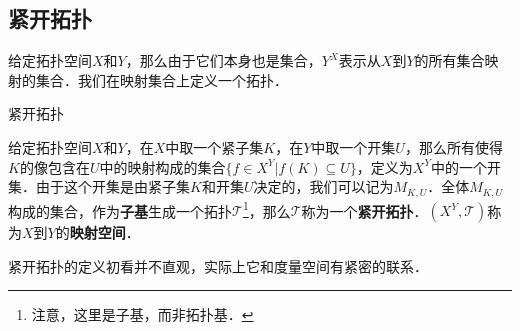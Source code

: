 \subsection{紧开拓扑}

给定拓扑空间$X$和$Y$，那么由于它们本身也是集合，$Y^X$表示从$X$到$Y$的所有集合映射的集合．我们在映射集合上定义一个拓扑．

\begin{definition}{紧开拓扑}

给定拓扑空间$X$和$Y$，在$X$中取一个紧子集$K$，在$Y$中取一个开集$U$，那么所有使得$K$的像包含在$U$中的映射构成的集合$\{f\in X^Y|f(K)\subseteq U\}$，定义为$X^Y$中的一个开集．由于这个开集是由紧子集$K$和开集$U$决定的，我们可以记为$M_{K, U}$．全体$M_{K, U}$构成的集合，作为\textbf{子基}生成一个拓扑$\mathcal{T}$\footnote{注意，这里是子基，而非拓扑基．}，那么$\mathcal{T}$称为一个\textbf{紧开拓扑}．$(X^Y, \mathcal{T})$称为$X$到$Y$的\textbf{映射空间}．

\end{definition}

紧开拓扑的定义初看并不直观，实际上它和度量空间有紧密的联系．

